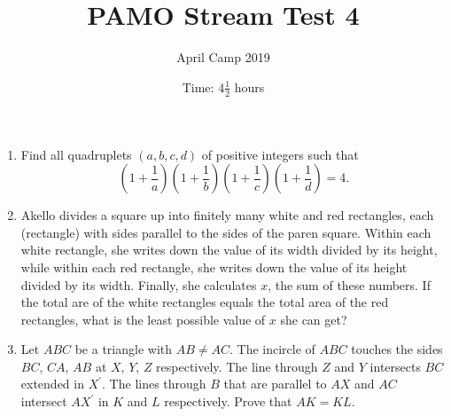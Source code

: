 \documentclass[a4paper, 12pt]{article}
\title{PAMO Stream Test 4}
\author{April Camp 2019}
\date{Time: $4 \frac{1}{2}$ hours}
\begin{document}
 \maketitle

\begin{enumerate}

\item Find all quadruplets $(a, b, c, d)$ of positive integers such that
\[
    \left( 1 + \frac{1}{a} \right) \left( 1 + \frac{1}{b} \right) \left( 1 + \frac{1}{c} \right) \left( 1 + \frac{1}{d} \right) = 4.
\]


\item Akello divides a square up into finitely many white and red rectangles, each (rectangle) with sides parallel to the sides of the paren square. Within each white rectangle, she writes down the value of its width divided by its height, while within each red rectangle, she writes down the value of its height divided by its width. Finally, she calculates $x$, the sum of these numbers. If the total are of the white rectangles equals the total area of the red rectangles, what is the least possible value of $x$ she can get?


\item\label{problem:geometry_incircle} %
Let $ABC$ be a triangle with $AB \neq AC$. The incircle of $ABC$ touches the sides $BC$, $CA$, $AB$ at $X$, $Y$, $Z$ respectively. The line through $Z$ and $Y$ intersects $BC$ extended in $X^\prime$. The lines through $B$ that are parallel to $AX$ and $AC$ intersect $AX^\prime$ in $K$ and $L$ respectively. Prove that $AK = KL$.


\end{enumerate}

\vfill

\centering

\vspace{12mm}
\end{document}
